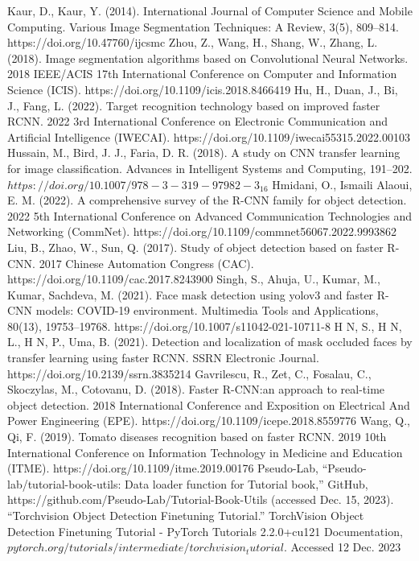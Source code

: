 \documentclass[conference]{IEEEtran}
\begin{document}
\newpage
\begin{thebibliography}{00}
     Kaur, D., Kaur, Y. (2014). International Journal of Computer Science and Mobile Computing. Various Image Segmentation Techniques: A Review, 3(5), 809–814. https://doi.org/10.47760/ijcsmc 
     Zhou, Z., Wang, H., Shang, W., Zhang, L. (2018). Image segmentation algorithms based on Convolutional Neural Networks. 2018 IEEE/ACIS 17th International Conference on Computer and Information Science (ICIS). https://doi.org/10.1109/icis.2018.8466419 
     Hu, H., Duan, J., Bi, J., Fang, L. (2022). Target recognition technology based on improved faster RCNN. 2022 3rd International Conference on Electronic Communication and Artificial Intelligence (IWECAI). https://doi.org/10.1109/iwecai55315.2022.00103 
     Hussain, M., Bird, J. J., Faria, D. R. (2018). A study on CNN transfer learning for image classification. Advances in Intelligent Systems and Computing, 191–202. $https://doi.org/10.1007/978-3-319-97982-3_16$
     Hmidani, O., Ismaili Alaoui, E. M. (2022). A comprehensive survey of the R-CNN family for object detection. 2022 5th International Conference on Advanced Communication Technologies and Networking (CommNet). https://doi.org/10.1109/commnet56067.2022.9993862 
     Liu, B., Zhao, W., Sun, Q. (2017). Study of object detection based on faster R-CNN. 2017 Chinese Automation Congress (CAC). https://doi.org/10.1109/cac.2017.8243900 
     Singh, S., Ahuja, U., Kumar, M., Kumar, Sachdeva, M. (2021). Face mask detection using yolov3 and faster R-CNN models: COVID-19 environment. Multimedia Tools and Applications, 80(13), 19753–19768. https://doi.org/10.1007/s11042-021-10711-8 
     H N, S., H N, L., H N, P., Uma, B. (2021). Detection and localization of mask occluded faces by transfer learning using faster RCNN. SSRN Electronic Journal. https://doi.org/10.2139/ssrn.3835214 
     Gavrilescu, R., Zet, C., Fosalau, C., Skoczylas, M., Cotovanu, D. (2018). Faster R-CNN:an approach to real-time object detection. 2018 International Conference and Exposition on Electrical And Power Engineering (EPE). https://doi.org/10.1109/icepe.2018.8559776 
     Wang, Q., Qi, F. (2019). Tomato diseases recognition based on faster RCNN. 2019 10th International Conference on Information Technology in Medicine and Education (ITME). https://doi.org/10.1109/itme.2019.00176 
     Pseudo-Lab, “Pseudo-lab/tutorial-book-utils: Data loader function for Tutorial book,” GitHub, https://github.com/Pseudo-Lab/Tutorial-Book-Utils (accessed Dec. 15, 2023).
     {“Torchvision Object Detection Finetuning Tutorial.” TorchVision Object Detection Finetuning Tutorial - PyTorch Tutorials 2.2.0+cu121 Documentation, $pytorch.org/tutorials/intermediate/torchvision_tutorial$. Accessed 12 Dec. 2023}
\end{thebibliography}
\vspace{12pt}
\end{document}
